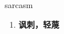 
\begin{frame}
{\huge sarcasm}
\begin{center}
\begin{enumerate}\Large
  \item \textbf{讽刺，轻蔑}
\end{enumerate}
\end{center}
\end{frame}
